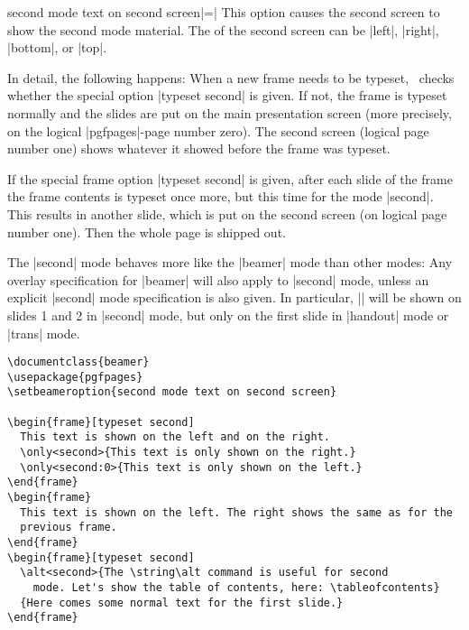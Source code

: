 \begin{beameroption}{second mode text on second screen}{|=|}
  This option causes the second screen to show the second mode material. The  of the second screen can be |left|, |right|, |bottom|, or |top|.

  In detail, the following happens: When a new frame needs to be typeset, \beamer\ checks whether the special option |typeset second| is given. If not, the frame is typeset normally and the slides are put on the main presentation screen (more precisely, on the logical |pgfpages|-page number zero). The second screen (logical page number one) shows whatever it showed before the frame was typeset.

  If the special frame option |typeset second| is given, after each slide of the frame the frame contents is typeset once more, but this time for the mode |second|. This results in another slide, which is put on the second screen (on logical page number one). Then the whole page is shipped out.

  The |second| mode behaves more like the |beamer| mode than other modes: Any overlay specification for |beamer| will also apply to |second| mode, unless an explicit |second| mode specification is also given. In particular, || will be shown on slides 1 and 2 in |second| mode, but only on the first slide in |handout| mode or |trans| mode.

  \example
\begin{verbatim}
\documentclass{beamer}
\usepackage{pgfpages}
\setbeameroption{second mode text on second screen}

\begin{frame}[typeset second]
  This text is shown on the left and on the right.
  \only<second>{This text is only shown on the right.}
  \only<second:0>{This text is only shown on the left.}
\end{frame}
\begin{frame}
  This text is shown on the left. The right shows the same as for the
  previous frame.
\end{frame}
\begin{frame}[typeset second]
  \alt<second>{The \string\alt command is useful for second
    mode. Let's show the table of contents, here: \tableofcontents}
  {Here comes some normal text for the first slide.}
\end{frame}

\end{verbatim}


\end{beameroption}
